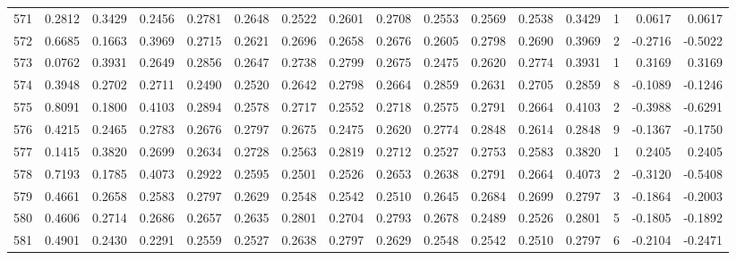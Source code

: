\begin{tabular}{lrrrrrrrrrrrrrrr}
571 &      0.2812 &  0.3429 &  0.2456 &  0.2781 &  0.2648 &  0.2522 &  0.2601 &  0.2708 &  0.2553 &  0.2569 &   0.2538 &     0.3429 &      1 &                    0.0617 &                     0.0617 \\
572 &      0.6685 &  0.1663 &  0.3969 &  0.2715 &  0.2621 &  0.2696 &  0.2658 &  0.2676 &  0.2605 &  0.2798 &   0.2690 &     0.3969 &      2 &                   -0.2716 &                    -0.5022 \\
573 &      0.0762 &  0.3931 &  0.2649 &  0.2856 &  0.2647 &  0.2738 &  0.2799 &  0.2675 &  0.2475 &  0.2620 &   0.2774 &     0.3931 &      1 &                    0.3169 &                     0.3169 \\
574 &      0.3948 &  0.2702 &  0.2711 &  0.2490 &  0.2520 &  0.2642 &  0.2798 &  0.2664 &  0.2859 &  0.2631 &   0.2705 &     0.2859 &      8 &                   -0.1089 &                    -0.1246 \\
575 &      0.8091 &  0.1800 &  0.4103 &  0.2894 &  0.2578 &  0.2717 &  0.2552 &  0.2718 &  0.2575 &  0.2791 &   0.2664 &     0.4103 &      2 &                   -0.3988 &                    -0.6291 \\
576 &      0.4215 &  0.2465 &  0.2783 &  0.2676 &  0.2797 &  0.2675 &  0.2475 &  0.2620 &  0.2774 &  0.2848 &   0.2614 &     0.2848 &      9 &                   -0.1367 &                    -0.1750 \\
577 &      0.1415 &  0.3820 &  0.2699 &  0.2634 &  0.2728 &  0.2563 &  0.2819 &  0.2712 &  0.2527 &  0.2753 &   0.2583 &     0.3820 &      1 &                    0.2405 &                     0.2405 \\
578 &      0.7193 &  0.1785 &  0.4073 &  0.2922 &  0.2595 &  0.2501 &  0.2526 &  0.2653 &  0.2638 &  0.2791 &   0.2664 &     0.4073 &      2 &                   -0.3120 &                    -0.5408 \\
579 &      0.4661 &  0.2658 &  0.2583 &  0.2797 &  0.2629 &  0.2548 &  0.2542 &  0.2510 &  0.2645 &  0.2684 &   0.2699 &     0.2797 &      3 &                   -0.1864 &                    -0.2003 \\
580 &      0.4606 &  0.2714 &  0.2686 &  0.2657 &  0.2635 &  0.2801 &  0.2704 &  0.2793 &  0.2678 &  0.2489 &   0.2526 &     0.2801 &      5 &                   -0.1805 &                    -0.1892 \\
581 &      0.4901 &  0.2430 &  0.2291 &  0.2559 &  0.2527 &  0.2638 &  0.2797 &  0.2629 &  0.2548 &  0.2542 &   0.2510 &     0.2797 &      6 &                   -0.2104 &                    -0.2471 \\

\end{tabular}
